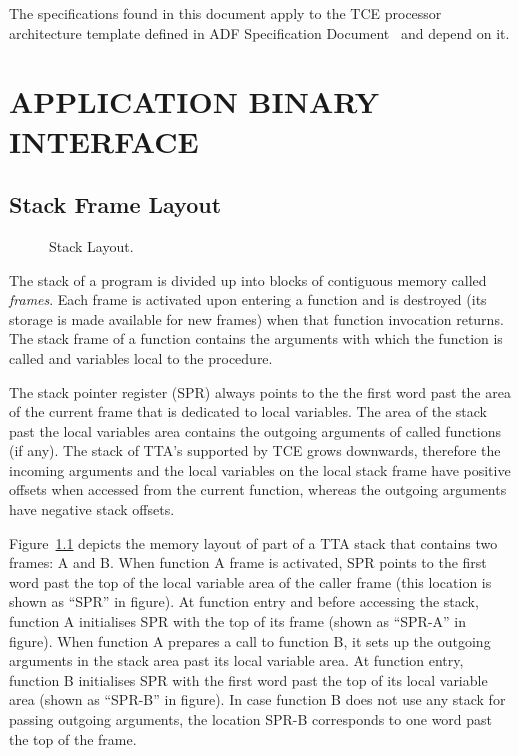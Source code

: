 \documentclass[twoside]{tce}
\begin{document}
The specifications found in this document apply to the TCE processor
architecture template defined in ADF Specification Document~\cite{ADF-specs}
and depend on it.

\chapter{APPLICATION BINARY INTERFACE}

\section{Stack Frame Layout}
\label{sec:stack-layout}

\begin{figure}[t]
  \centerline{
  }
  \caption{Stack Layout.}
  \label{fig:stack-frame}
\end{figure}

The stack of a program is divided up into blocks of contiguous memory called
\emph{frames}. Each frame is activated upon entering a function and is
destroyed (its storage is made available for new frames) when that function
invocation returns. The stack frame of a function contains the arguments
with which the function is called and variables local to the procedure.

The stack pointer register (SPR) always points to the the first word past
the area of the current frame that is dedicated to local variables.  The
area of the stack past the local variables area contains the outgoing
arguments of called functions (if any).  The stack of TTA's supported by TCE
grows downwards, therefore the incoming arguments and the local variables on
the local stack frame have positive offsets when accessed from the current
function, whereas the outgoing arguments have negative stack offsets.

Figure~\ref{fig:stack-frame} depicts the memory layout of part of a TTA
stack that contains two frames: A and B.  When function A frame is
activated, SPR points to the first word past the top of the local variable
area of the caller frame (this location is shown as ``SPR'' in figure).  At
function entry and before accessing the stack, function A initialises SPR
with the top of its frame (shown as ``SPR-A'' in figure).  When function A
prepares a call to function B, it sets up the outgoing arguments in the
stack area past its local variable area.  At function entry, function B
initialises SPR with the first word past the top of its local variable area
(shown as ``SPR-B'' in figure).  In case function B does not use any stack
for passing outgoing arguments, the location SPR-B corresponds to one word
past the top of the frame.
\end{document}
